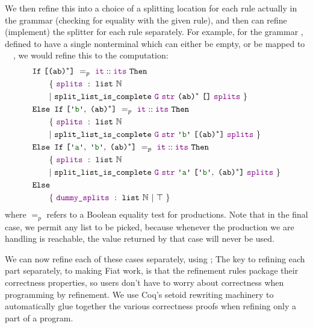     We then refine this into a choice of a splitting location for each rule actually in the grammar (checking for equality with the given rule), and then can refine (implement) the splitter for each rule separately.  For example, for the grammar , defined to have a single nonterminal  which can either be empty, or be mapped to ~~, we would refine this to the computation:\label{sec:if-folding}
\newcommand{\ndcompfor}[3][]{%
#1\{~\farg{splits}~:~\indname{list}~{\mathbb{N}} \\
&\phantom{#1} |~\fname{split\_list\_is\_complete}~\farg{G}~\farg{str}~#2~#3~\farg{splits}~\}
}
\begin{align*}
& \fname{If}~\valuelist{\nt{(ab)\ensuremath{^*}}}~=_p~\cons{\farg{it}}{\farg{its}}~\fname{Then} \\
&\ndcompfor[\qquad]{\nt{(ab)\ensuremath{^*}}}{\nil} \\
& \fname{Else~If}~\valuelist{\terminal{b},~\nt{(ab)\ensuremath{^*}}}~=_p~\cons{\farg{it}}{\farg{its}}~\fname{Then} \\
&\ndcompfor[\qquad]{\terminal{b}}{\valuelist{\nt{(ab)\ensuremath{^*}}}} \\
& \fname{Else~If}~\valuelist{\terminal{a},~\terminal{b},~\nt{(ab)\ensuremath{^*}}}~=_p~\cons{\farg{it}}{\farg{its}}~\fname{Then} \\
&\ndcompfor[\qquad]{\terminal{a}}{\valuelist{\terminal{b},~\nt{(ab)\ensuremath{^*}}}} \\
& \fname{Else} \\
&\qquad\{~\farg{dummy\_splits}~:~\indname{list}~\mathbb{N}~|~\True~\} \\
\end{align*}
       where $=_p$ refers to a Boolean equality test for productions.  Note that in the final case, we permit any list to be picked, because whenever the production we are handling is reachable, the value returned by that case will never be used.
    
       We can now refine each of these cases separately, using ;   The key to refining each part separately, to making Fiat work, is that the refinement rules package their correctness properties, so users don't have to worry about correctness when programming by refinement.  We use Coq's setoid rewriting machinery to automatically glue together the various correctness proofs when refining only a part of a program.
           
